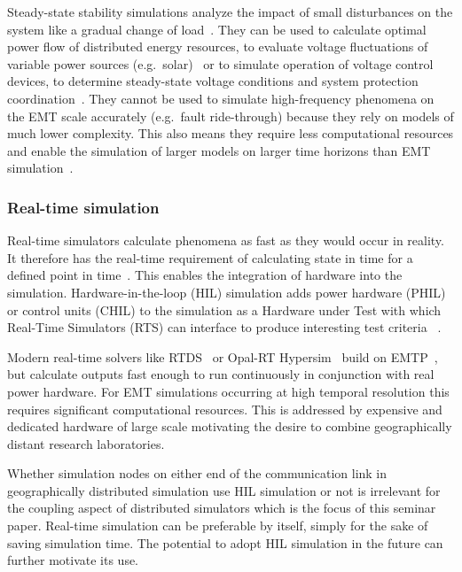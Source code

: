 \documentclass[a4paper]{atseminar}
\begin{document}
Steady-state stability simulations analyze the impact of small disturbances on the system like a gradual change of load~\cite{sauer1998}. 
They can be used to calculate optimal power flow of distributed energy resources, to evaluate voltage fluctuations of variable power sources (e.g.~solar)~\cite{ieee1547.7} or to simulate operation of voltage control devices, to determine steady-state voltage conditions and system protection coordination~\cite{broderick2013}.
They cannot be used to simulate high-frequency phenomena on the EMT scale accurately (e.g.~fault ride-through) because they rely on models of much lower complexity. This also means they require less computational resources and enable the simulation of larger models on larger time horizons than EMT simulation~\cite{lundstrom2017}.


\subsubsection{Real-time simulation}
\label{MH:sec:bg:real-time}

Real-time simulators calculate phenomena as fast as they would occur in reality. It therefore has the real-time requirement of calculating state in time for a defined point in time~\cite{belanger2010}. This enables the integration of hardware into the simulation.
Hardware-in-the-loop (HIL) simulation adds power hardware (PHIL) or control units (CHIL) to the simulation as a Hardware under Test with which Real-Time Simulators (RTS) can interface to produce interesting test criteria ~\cite{deJong2012}. 

Modern real-time solvers like RTDS~\cite{rtds} or Opal-RT Hypersim~\cite{opal-rt} build on EMTP~\cite{dommel1964}, but calculate outputs fast enough to run continuously in conjunction with real power hardware. For EMT simulations occurring at high temporal resolution this requires significant computational resources. This is addressed by expensive and dedicated hardware of large scale motivating the desire to combine geographically distant research laboratories.

Whether simulation nodes on either end of the communication link in geographically distributed simulation use HIL simulation or not is irrelevant for the coupling aspect of distributed simulators which is the focus of this seminar paper.
Real-time simulation can be preferable by itself, simply for the sake of saving simulation time. 
The potential to adopt HIL simulation in the future can further motivate its use.
\end{document}
